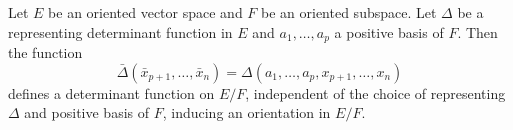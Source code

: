 Let $E$ be an oriented vector space and $F$ be an oriented subspace. Let $\Delta$ be a representing determinant function in $E$ and $a_1, \ldots, a_p$ a positive basis of $F$. Then the function
$$\bar{\Delta}(\bar{x}_{p+1}, \ldots, \bar{x}_n) = \Delta(a_1, \ldots, a_p, x_{p+1}, \ldots, x_n)$$
defines a determinant function on $E/F$, independent of the choice of representing $\Delta$ and positive basis of $F$, inducing an orientation in $E/F$.
